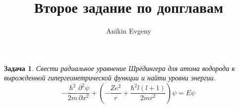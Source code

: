 \documentclass{article}
\title{Второе задание по допглавам}
\author{Anikin Evgeny}
\newtheorem{problem}{Задача}
\begin{document}
\maketitle
\begin{problem}
    Свести радиальное уравнение Шрёдингера для атома водорода к вырожденной 
    гипергеометрической функции и найти уровни энергии.
    \begin{equation}
        -\frac{\hbar^2}{2m}\frac{\partial^2 \psi}{\partial x^2} + 
            \left(-\frac{Ze^2}{r} + \frac{\hbar^2l(l+1)}{2mr^2}\right)\psi = E\psi
    \end{equation}
\end{problem}
\end{document}
